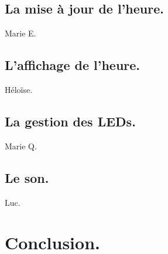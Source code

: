 \documentclass{article}
\begin{document}
\subsection{La mise à jour de l'heure.}
Marie E.

\subsection{L'affichage de l'heure.}
Héloïse.

\subsection{La gestion des LEDs.}
Marie Q.

\subsection{Le son.}
Luc.

\section{Conclusion.}
\end{document}
